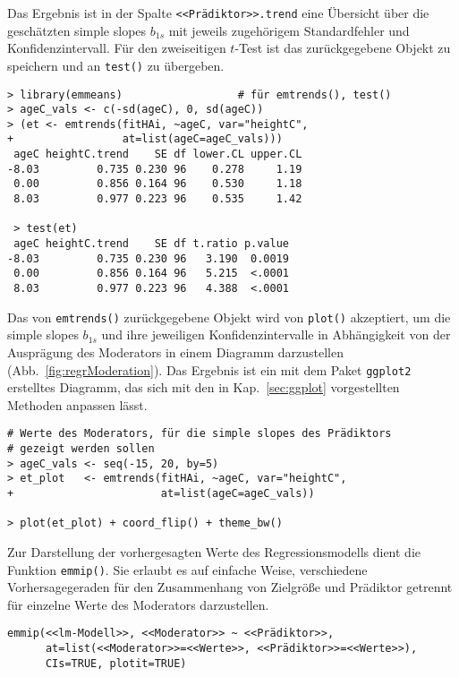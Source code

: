 Das Ergebnis ist in der Spalte \lstinline!<<Prädiktor>>.trend! eine Übersicht über die geschätzten simple slopes $b_{1s}$ mit jeweils zugehörigem Standardfehler und Konfidenzintervall. Für den zweiseitigen $t$-Test ist das zurückgegebene Objekt zu speichern und an \lstinline!test()! zu übergeben.
\begin{lstlisting}
> library(emmeans)                  # für emtrends(), test()
> ageC_vals <- c(-sd(ageC), 0, sd(ageC))
> (et <- emtrends(fitHAi, ~ageC, var="heightC",
+                 at=list(ageC=ageC_vals)))
 ageC heightC.trend    SE df lower.CL upper.CL
-8.03         0.735 0.230 96    0.278     1.19
 0.00         0.856 0.164 96    0.530     1.18
 8.03         0.977 0.223 96    0.535     1.42

 > test(et)
 ageC heightC.trend    SE df t.ratio p.value
-8.03         0.735 0.230 96   3.190  0.0019
 0.00         0.856 0.164 96   5.215  <.0001
 8.03         0.977 0.223 96   4.388  <.0001
\end{lstlisting}

Das von \lstinline!emtrends()! zurückgegebene Objekt wird von \lstinline!plot()! akzeptiert, um die simple slopes $b_{1s}$ und ihre jeweiligen Konfidenzintervalle in Abhängigkeit von der Ausprägung des Moderators in einem Diagramm darzustellen (Abb.\ \ref{fig:regrModeration}). Das Ergebnis ist ein mit dem Paket \lstinline!ggplot2! erstelltes Diagramm, das sich mit den in Kap.\ \ref{sec:ggplot} vorgestellten Methoden anpassen lässt.
\begin{lstlisting}
# Werte des Moderators, für die simple slopes des Prädiktors
# gezeigt werden sollen
> ageC_vals <- seq(-15, 20, by=5)
> et_plot   <- emtrends(fitHAi, ~ageC, var="heightC",
+                       at=list(ageC=ageC_vals))

> plot(et_plot) + coord_flip() + theme_bw()
\end{lstlisting}

Zur Darstellung der vorhergesagten Werte des Regressionsmodells dient die Funktion \lstinline!emmip()!. Sie erlaubt es auf einfache Weise, verschiedene Vorhersagegeraden für den Zusammenhang von Zielgröße und Prädiktor getrennt für einzelne Werte des Moderators darzustellen.
\begin{lstlisting}
emmip(<<lm-Modell>>, <<Moderator>> ~ <<Prädiktor>>,
      at=list(<<Moderator>>=<<Werte>>, <<Prädiktor>>=<<Werte>>),
      CIs=TRUE, plotit=TRUE)
\end{lstlisting}

